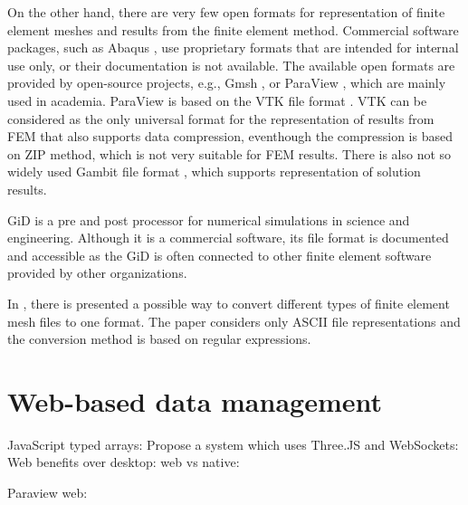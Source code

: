 

On the other hand, there are very few open formats for representation of finite element meshes and results from the finite element method. Commercial software packages, such as Abaqus \cite{Abaqus}, use proprietary formats that are intended for internal use only, or their documentation is not available. The available open formats are provided by open-source projects, e.g., Gmsh \cite{Geuzaine2009}, or ParaView \cite{ParaView2005}, which are mainly used in academia. ParaView is based on the VTK file format \cite{VTK2015}. VTK can be considered as the only universal format for the representation of results from FEM that also supports data compression, eventhough the compression is based on ZIP method, which is not very suitable for FEM results. There is also not so widely used Gambit file format \cite{GAMBIT}, which supports representation of solution results.

GiD \cite{GiDWeb} is a pre and post processor for numerical simulations in science and engineering. Although it is a commercial software, its file format is documented \cite{GiDPostProcess} and accessible as the GiD is often connected to other finite element software provided by other organizations.

In \cite{Ivanyi2012}, there is presented a possible way to convert different types of finite element mesh files to one format. The paper considers only ASCII file representations and the conversion method is based on regular expressions.

\section{Web-based data management}

JavaScript typed arrays: \cite{Behr2012}
Propose a system which uses Three.JS and WebSockets: \cite{Marion2012}
Web benefits over desktop: \cite{Mouton2011}
web vs native: \cite{Charland2011}

\cite{Ari2013}
\cite{Yu2010}
\cite{Peng2003}
\cite{Heber2007I}
\cite{Heber2007II}
\cite{Weng2011}
\cite{Chen2008}

Paraview web: \cite{Jourdain2011}

\cite{SimScale}
